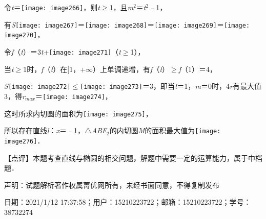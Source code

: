 \documentclass[a4paper,11pt,UTF8,twoside]{ctexart} %
\begin{document}
令\textit{t}＝\texttt{[image: image266]}，则\textit{t}$\mathrm{\ge}$1，且\textit{m}${}^{2}$＝\textit{t}${}^{2}$﹣1，

有\textit{S}\texttt{[image: image267]}＝\texttt{[image: image268]}＝\texttt{[image: image269]}＝\texttt{[image: image270]}，

令\textit{f}（\textit{t}）＝3\textit{t}+\texttt{[image: image271]}（\textit{t}$\mathrm{\ge}$1），

当\textit{t}$\mathrm{\ge}$1时，\textit{f}（\textit{t}）在[1，+$\mathrm{\infty}$）上单调递增，有\textit{f}（\textit{t}）$\mathrm{\ge}$\textit{f}（1）＝4，

\textit{S}\texttt{[image: image272]}$\mathrm{\le}$\texttt{[image: image273]}＝3，即当\textit{t}＝1，\textit{m}＝0时，4\textit{r}有最大值3，得\textit{r${}_{max}$}＝\texttt{[image: image274]}，

这时所求内切圆的面积为\texttt{[image: image275]}，

所以存在直线\textit{l}：\textit{x}＝﹣1，$\mathrm{\triangle}$\textit{ABF}${}_{2}$的内切圆\textit{M}的面积最大值为\texttt{[image: image276]}．

【点评】本题考查直线与椭圆的相交问题，解题中需要一定的运算能力，属于中档题．

声明：试题解析著作权属菁优网所有，未经书面同意，不得复制发布

日期：2021/1/12 17:37:58；用户：15210223722；邮箱：15210223722；学号：38732274
\end{document}
